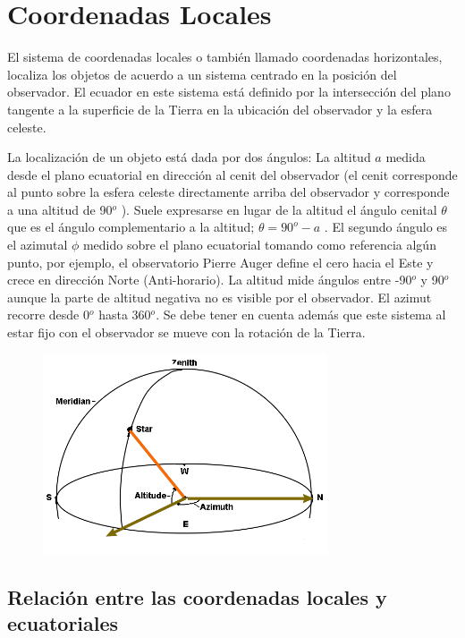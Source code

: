 \section{Coordenadas Locales} \label{apendice:local}

El sistema de coordenadas locales o también llamado coordenadas horizontales, localiza los objetos de acuerdo a un sistema centrado en la posición del observador. El ecuador en este sistema está definido por la intersección del plano tangente a la superficie de la Tierra en la ubicación del observador y la esfera celeste. 

La localización de un objeto está dada por dos ángulos: La altitud $a$ medida desde el plano ecuatorial en dirección al cenit del observador (el cenit corresponde al punto sobre la esfera celeste directamente arriba del observador y corresponde a una altitud de 90$^o$ ). Suele expresarse en lugar de la altitud el ángulo cenital $\theta$ que es el ángulo
complementario a la altitud; $\theta = 90^o - a$ . El segundo ángulo es el azimutal $\phi$ medido sobre el plano ecuatorial tomando como referencia algún punto, por ejemplo, el observatorio Pierre Auger define el cero hacia el Este y crece en dirección Norte (Anti-horario). La altitud mide ángulos entre -90$^o$ y 90$^o$ aunque la parte de altitud negativa no es visible por el observador. El azimut recorre desde 0$^o$ hasta 360$^o$. Se debe tener en cuenta además que este sistema al estar fijo con el observador se mueve con la rotación de la Tierra.


\begin{figure}[H]
    \begin{small}
        \begin{center}
            \includegraphics[width=0.75\textwidth]{LC.png}
        \end{center}
        \caption{}
        \label{fig:}
    \end{small}
\end{figure}


\subsection{Relación entre las coordenadas locales y ecuatoriales} \label{cambio_coord}
